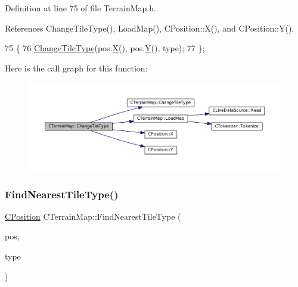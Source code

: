 Definition at line 75 of file Terrain\+Map.\+h.



References Change\+Tile\+Type(), Load\+Map(), C\+Position\+::\+X(), and C\+Position\+::\+Y().


\begin{DoxyCode}
75                                                                  \{
76             \hyperlink{classCTerrainMap_a40757d66d7458620a327d6f69a35a2bd}{ChangeTileType}(pos.\hyperlink{classCPosition_a9a6b94d3b91df1492d166d9964c865fc}{X}(), pos.\hyperlink{classCPosition_a1aa8a30e2f08dda1f797736ba8c13a87}{Y}(), type);
77         \};
\end{DoxyCode}
Here is the call graph for this function\+:\nopagebreak
\begin{figure}[H]
\begin{center}
\leavevmode
\includegraphics[width=350pt]{classCTerrainMap_a4a4f26c13a3d8116f4295bef3c25c3e5_cgraph}
\end{center}
\end{figure}
\hypertarget{classCTerrainMap_af32811cace3a3b01c9519b304ddb8efc}{}\label{classCTerrainMap_af32811cace3a3b01c9519b304ddb8efc} 
\subsubsection{\texorpdfstring{Find\+Nearest\+Tile\+Type()}{FindNearestTileType()}}
{\footnotesize\ttfamily \hyperlink{classCPosition}{C\+Position} C\+Terrain\+Map\+::\+Find\+Nearest\+Tile\+Type (\begin{DoxyParamCaption}\item[{const \hyperlink{classCPosition}{C\+Position} \&}]{pos,  }\item[{\hyperlink{classCTerrainMap_aff2ab991e237269941416dd79d8871d4}{E\+Tile\+Type}}]{type }\end{DoxyParamCaption})}



